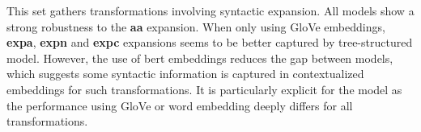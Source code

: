 This set gathers transformations involving syntactic expansion.  All models show a strong robustness to the \textbf{aa} expansion. When only using GloVe embeddings, \textbf{expa}, \textbf{expn} and \textbf{expc} expansions seems to be better captured by tree-structured model. However, the use of bert embeddings reduces the gap between models, which suggests some syntactic information is captured in contextualized embeddings for such transformations. It is particularly explicit for the \bow model as the performance using GloVe or \bert word embedding deeply differs for all transformations. 


